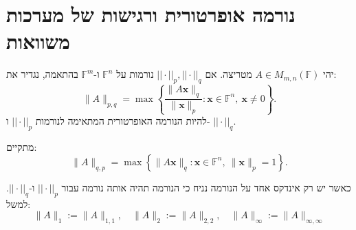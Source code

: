 \documentclass{tstextbook}
\begin{document}
\section{נורמה אופרטורית ורגישות של מערכות משוואות}

\begin{definition}
יהי \(A \in M_{m,n}\left( \mathbb{F}  \right)\) מטריצה. אם \(||\cdot||_{p},||\cdot||_{q}\) נורמות על \(\mathbb{F} ^{n}\) ו-\(\mathbb{F} ^{m}\) בהתאמה, נגדיר את:
$$\|A\|_{p,q}=\operatorname*{max}\left\{{\frac{\|A\mathbf{x}\|_{q}}{\|\mathbf{x}\|_{p}}}:\mathbf{x}\in\mathbb{F}^{n},\ \mathbf{x}\neq0\right\}.$$
להיות הנורמה האופרטורית המתאימה לנורמות \(||\cdot||_{p}\) ו- \(||\cdot||_{q}\).

\end{definition}
\begin{proposition}
מתקיים:
$$\|A\|_{q,p}=\operatorname*{max}\left\{\|A\mathbf{x}\|_{q}:\mathbf{x}\in\mathbb{F}^{n},\ \|\mathbf{x}\|_{p}=1\right\}.$$

\end{proposition}
\begin{symbolize}
כאשר יש רק אינדקס אחד על הנורמה נניח כי הנורמה תהיה אותה נורמה עבור \(||\cdot||_{p}\) ו-\(||\cdot||_{q}\). למשל:
$$\|A\|_{1}:=\|A\|_{1,1},\quad\|A\|_{2}:=\|A\|_{2,2},\quad\|A\|_{\infty}:=\|A\|_{\infty,\infty}$$

\end{symbolize}
\end{document}

